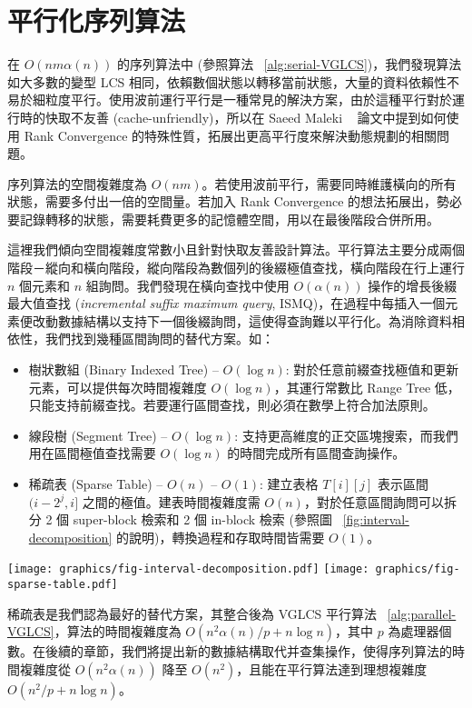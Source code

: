 \section{平行化序列算法} %
\label{sec:parallelSerial}

在 $O(nm \alpha(n))$ 的序列算法中 (參照算法 ~\ref{alg:serial-VGLCS})，我們發現算法如大多數的變型 LCS 相同，依賴數個狀態以轉移當前狀態，大量的資料依賴性不易於細粒度平行。使用波前運行平行是一種常見的解決方案，由於這種平行對於運行時的快取不友善 (cache-unfriendly)，所以在 Saeed Maleki ~\cite{saeed} 論文中提到如何使用 Rank Convergence 的特殊性質，拓展出更高平行度來解決動態規劃的相關問題。



序列算法的空間複雜度為 $O(nm)$。若使用波前平行，需要同時維護橫向的所有狀態，需要多付出一倍的空間量。若加入 Rank Convergence 的想法拓展出，勢必要記錄轉移的狀態，需要耗費更多的記憶體空間，用以在最後階段合併所用。

這裡我們傾向空間複雜度常數小且針對快取友善設計算法。平行算法主要分成兩個階段－縱向和橫向階段，縱向階段為數個列的後綴極值查找，橫向階段在行上運行 $n$ 個元素和 $n$ 組詢問。我們發現在橫向查找中使用 $O(\alpha(n))$ 操作的增長後綴最大值查找 (\emph{incremental suffix maximum query}, ISMQ)，在過程中每插入一個元素便改動數據結構以支持下一個後綴詢問，這使得查詢難以平行化。為消除資料相依性，我們找到幾種區間詢問的替代方案。如：

\begin{itemize}
  \item 樹狀數組 (Binary Indexed Tree) -- $O(\log n)$: 對於任意前綴查找極值和更新元素，可以提供每次時間複雜度 $O(\log n)$，其運行常數比 Range Tree 低，只能支持前綴查找。若要運行區間查找，則必須在數學上符合加法原則。
  \item 線段樹 (Segment Tree) -- $O(\log n)$: 支持更高維度的正交區塊搜索，而我們用在區間極值查找需要 $O(\log n)$ 的時間完成所有區間查詢操作。
  \item 稀疏表 (Sparse Table) -- $O(n)$ -- $O(1)$:
    建立表格 $T[i][j]$ 表示區間 $(i-2^j,i]$ 之間的極值。建表時間複雜度需 $O(n)$，對於任意區間詢問可以拆分 2 個 super-block 檢索和 2 個 in-block 檢索 (參照圖 ~\ref{fig:interval-decomposition} 的說明)，轉換過程和存取時間皆需要 $O(1)$。
\end{itemize}

\begin{figure*}
  \centering
  \texttt{[image: graphics/fig-interval-decomposition.pdf]}
  \texttt{[image: graphics/fig-sparse-table.pdf]}
  \caption{給定一陣列 $A$ 如上圖所述，並且拆成 5 個區塊，每個區塊皆有 4 個元素，若詢問區間 $[2, 18]$ 的最大值，將分成 $B1$ 的內部詢問 (in-block query) $Q_L$、$B5$ 的內部詢問 $Q_R$ 和兩個跨區間詢問 (super-block query) $SQ_L$、$SQ_R$}
  \label{fig:interval-decomposition}
\end{figure*}

稀疏表是我們認為最好的替代方案，其整合後為 VGLCS 平行算法 ~\ref{alg:parallel-VGLCS}，算法的時間複雜度為 $O(n^2 \alpha(n) / p + n \log n)$，其中 $p$ 為處理器個數。在後續的章節，我們將提出新的數據結構取代并查集操作，使得序列算法的時間複雜度從 $O(n^2 \alpha(n))$ 降至 $O(n^2)$，且能在平行算法達到理想複雜度 $O(n^2 / p + n \log n)$。

